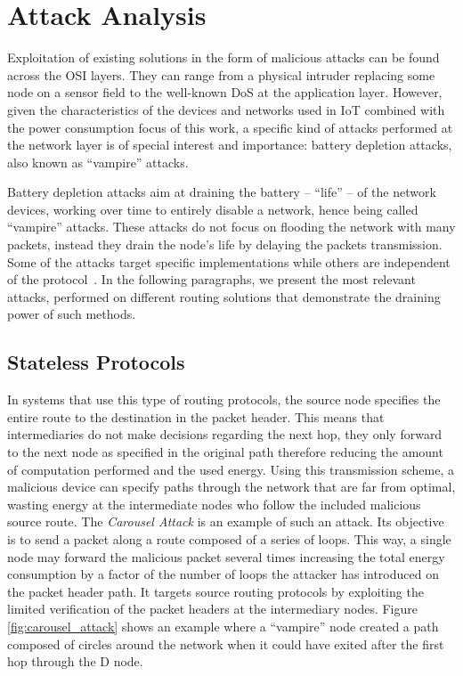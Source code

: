 \documentclass{sig-alternate-05-2015}
\begin{document}
\section{Attack Analysis}
\label{sec:attack_analysis}
Exploitation of existing solutions in the form of malicious attacks can be found across the \gls{OSI} layers. 
They can range from a physical intruder replacing some node on a sensor field to the well-known \gls{DoS} at the application layer. 
However, given the characteristics of the devices and networks used in \gls{IoT} combined with the power consumption focus of this work, a specific kind of attacks performed at the network layer is of special interest and importance: battery depletion attacks, also known as ``vampire'' attacks.

Battery depletion attacks aim at draining the battery -- ``life'' -- of the network devices, working over time to entirely disable a network, hence being called ``vampire'' attacks. 
These attacks do not focus on flooding the network with many packets, instead they drain the node's life by delaying the packets transmission. 
Some of the attacks target specific implementations while others are independent of the protocol~\cite{Vasserman2013}\cite{Pongle2015}. 
In the following paragraphs, we present the most relevant attacks, performed on different routing solutions that demonstrate the draining power of such methods.

\subsection{Stateless Protocols}
\label{sec:source_routing}
In systems that use this type of routing protocols, the source node specifies the entire route to the destination in the packet header. 
This means that intermediaries do not make decisions regarding the next hop, they only forward to the next node as specified in the original path therefore reducing the amount of computation performed and the used energy. 
Using this transmission scheme, a malicious device can specify paths through the network that are far from optimal, wasting energy at the intermediate nodes who follow the included malicious source route. 
The \emph{Carousel Attack} is an example of such an attack. 
Its objective is to send a packet along a route composed of a series of loops. 
This way, a single node may forward the malicious packet several times increasing the total energy consumption by a factor of the number of loops the attacker has introduced on the packet header path. 
It targets source routing protocols by exploiting the limited verification of the packet headers at the intermediary nodes. 
Figure \ref{fig:carousel_attack} shows an example where a ``vampire'' node created a path composed of circles around the network when it could have exited after the first hop through the D node.
 
\end{document}
